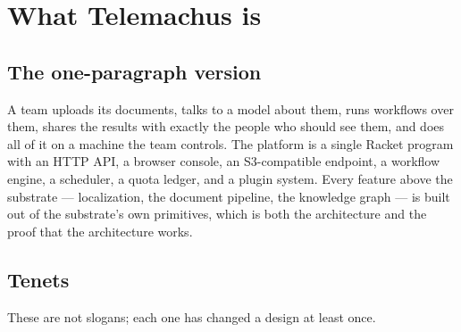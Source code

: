 \documentclass[11pt,a4paper]{report}
\gdef\currentchapterart{art/telemachus-head.png}
\newcommand{\chapterart}[1]{\gdef\currentchapterart{#1}}
\newcommand{\chapterart}[1]{}
\begin{document}
\tableofcontents

\chapterart{art/ch-01-what.png}
\chapter{What Telemachus is}

\section{The one-paragraph version}

A team uploads its documents, talks to a model about them, runs workflows over them, shares the results with exactly the people who should see them, and does all of it on a machine the team controls. The platform is a single Racket program with an HTTP API, a browser console, an S3-compatible endpoint, a workflow engine, a scheduler, a quota ledger, and a plugin system. Every feature above the substrate --- localization, the document pipeline, the knowledge graph --- is built out of the substrate's own primitives, which is both the architecture and the proof that the architecture works.

\section{Tenets}

These are not slogans; each one has changed a design at least once.
\end{document}
